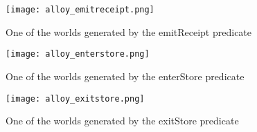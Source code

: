 \documentclass[../../main.tex]{subfiles}
\begin{document}
\begin{figure}[H]
  \centering
  \texttt{[image: alloy\_emitreceipt.png]}
  \caption{One of the worlds generated by the emitReceipt predicate}
\end{figure}

\begin{figure}[H]
  \centering
  \texttt{[image: alloy\_enterstore.png]}
  \caption{One of the worlds generated by the enterStore predicate}
\end{figure}

\begin{figure}[H]
  \centering
  \texttt{[image: alloy\_exitstore.png]}
  \caption{One of the worlds generated by the exitStore predicate}
\end{figure}
\end{document}
